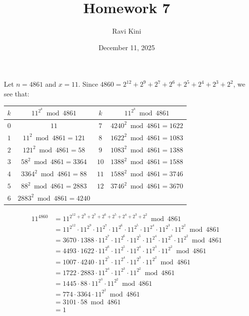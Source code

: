\documentclass{article}
\title{Homework 7}
\author{Ravi Kini}
\date{December 11, 2025}
\begin{document}
\maketitle

\problem{}
Let $n = 4861$ and $x = 11$. Since $4860 = 2^{12} + 2^9 + 2^7 + 2^6 + 2^5 + 2^4 + 2^3 + 2^2$, we see that:
\begin{center}
\begin{tabular}{|c|c|c|c|}
    \hline
    $k$ & $11^{2^k} \bmod 4861$ & $k$ & $11^{2^k} \bmod 4861$ \\
    \hline
    $0$ & $11$ & $7$ & $4240^2 \bmod 4861 = 1622$ \\
    $1$ & $11^2 \bmod 4861 = 121$ & $8$ & $1622^2 \bmod 4861 = 1083$ \\
    $2$ & $121^2 \bmod 4861 = 58$ & $9$ & $1083^2 \bmod 4861 = 1388$ \\
    $3$ & $58^2 \bmod 4861 = 3364$ & $10$ & $1388^2 \bmod 4861 = 1588$ \\
    $4$ & $3364^2 \bmod 4861 = 88$ & $11$ & $1588^2 \bmod 4861 = 3746$ \\
    $5$ & $88^2 \bmod 4861 = 2883$ & $12$ & $3746^2 \bmod 4861 = 3670$ \\
    $6$ & $2883^2 \bmod 4861 = 4240$ & & \\
    \hline
\end{tabular}
\end{center}
\begin{align*}
    11^{4860} & = 11^{2^{12} + 2^9 + 2^7 + 2^6 + 2^5 + 2^4 + 2^3 + 2^2} \bmod 4861 \\
    & = 11^{2^{12}} \cdot 11^{2^9} \cdot 11^{2^7} \cdot 11^{2^6} \cdot 11^{2^5} \cdot 11^{2^4} \cdot 11^{2^3} \cdot 11^{2^2} \bmod 4861 \\
    & = 3670 \cdot 1388 \cdot 11^{2^7} \cdot 11^{2^6} \cdot 11^{2^5} \cdot 11^{2^4} \cdot 11^{2^3} \cdot 11^{2^2} \bmod 4861 \\
    & = 4493 \cdot 1622 \cdot 11^{2^6} \cdot 11^{2^5} \cdot 11^{2^4} \cdot 11^{2^3} \cdot 11^{2^2} \bmod 4861 \\
    & = 1007 \cdot 4240 \cdot 11^{2^5} \cdot 11^{2^4} \cdot 11^{2^3} \cdot 11^{2^2} \bmod 4861 \\
    & = 1722 \cdot 2883 \cdot 11^{2^4} \cdot 11^{2^3} \cdot 11^{2^2} \bmod 4861 \\
    & = 1445 \cdot 88 \cdot 11^{2^3} \cdot 11^{2^2} \bmod 4861 \\
    & = 774 \cdot 3364 \cdot 11^{2^2} \bmod 4861 \\
    & = 3101 \cdot 58 \bmod 4861 \\
    & = 1
\end{align*}
\end{document}

